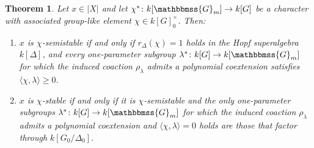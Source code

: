 \documentclass[11pt,a4paper,reqno,noamsfonts]{amsart}
\numberwithin{equation}{section}
\newtheorem{theorem}{Theorem}[section]
\theoremstyle{definition}
\theoremstyle{remark}
\newcommand{\GG}{\ensuremath{\mathbbmss{G}}}
\begin{document}
\begin{theorem}
Let $x \in \lvert X \rvert$ and let $\chi^* \colon k[\GG_m] \to k[G]$ be a character with associated group-like element $\chi \in k[G]_0^\times$. Then:
\begin{enumerate}
\item $x$ is $\chi$-semistable if and only if $r_\Delta(\chi) = 1$ holds in the Hopf superalgebra $k[\Delta]$, and every one-parameter subgroup $\lambda^* \colon k[G] \to k[\GG_m]$ for which the induced coaction $\rho_\lambda$ admits a polynomial coextension satisfies $\langle \chi, \lambda \rangle \geq 0$.

\item $x$ is $\chi$-stable if and only if it is $\chi$-semistable and the only one-parameter subgroups $\lambda^* \colon k[G] \to k[\GG_m]$ for which the induced coaction $\rho_\lambda$ admits a polynomial coextension and $\langle \chi, \lambda \rangle = 0$ holds are those that factor through $k[G_0/\Delta_0]$.
\end{enumerate}
\end{theorem}
\end{document}
